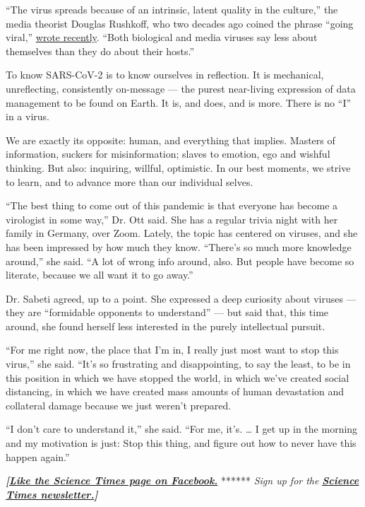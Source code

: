 ``The virus spreads because of an intrinsic, latent quality in the
culture,'' the media theorist Douglas Rushkoff, who two decades ago
coined the phrase ``going viral,''
\href{https://rushkoff.com/digital-trends-trump-media-virus/}{wrote
recently}. ``Both biological and media viruses say less about themselves
than they do about their hosts.''

To know SARS-CoV-2 is to know ourselves in reflection. It is mechanical,
unreflecting, consistently on-message --- the purest near-living
expression of data management to be found on Earth. It is, and does, and
is more. There is no ``I'' in a virus.

We are exactly its opposite: human, and everything that implies. Masters
of information, suckers for misinformation; slaves to emotion, ego and
wishful thinking. But also: inquiring, willful, optimistic. In our best
moments, we strive to learn, and to advance more than our individual
selves.

``The best thing to come out of this pandemic is that everyone has
become a virologist in some way,'' Dr. Ott said. She has a regular
trivia night with her family in Germany, over Zoom. Lately, the topic
has centered on viruses, and she has been impressed by how much they
know. ``There's so much more knowledge around,'' she said. ``A lot of
wrong info around, also. But people have become so literate, because we
all want it to go away.''

Dr. Sabeti agreed, up to a point. She expressed a deep curiosity about
viruses --- they are ``formidable opponents to understand'' --- but said
that, this time around, she found herself less interested in the purely
intellectual pursuit.

``For me right now, the place that I'm in, I really just most want to
stop this virus,'' she said. ``It's so frustrating and disappointing, to
say the least, to be in this position in which we have stopped the
world, in which we've created social distancing, in which we have
created mass amounts of human devastation and collateral damage because
we just weren't prepared.

``I don't care to understand it,'' she said. ``For me, it's. \ldots{} I
get up in the morning and my motivation is just: Stop this thing, and
figure out how to never have this happen again.''

\textbf{\emph{{[}}\href{http://on.fb.me/1paTQ1h}{\emph{Like the Science
Times page on Facebook.}}} ****** \emph{\textbar{} Sign up for the}
\textbf{\href{http://nyti.ms/1MbHaRU}{\emph{Science Times
newsletter.}}\emph{{]}}}


